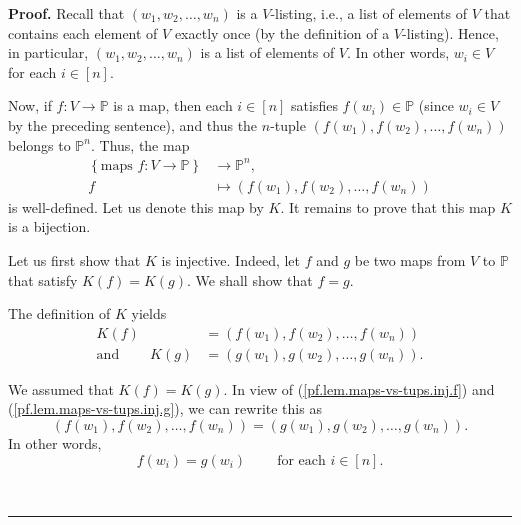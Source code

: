 \documentclass[numbers=enddot,12pt,final,onecolumn,notitlepage]{scrartcl}%
\numberwithin{exer}{section}
\theoremstyle{definition}
\newenvironment{proof}[1][Proof]{\noindent\textbf{#1.} }{\ \rule{0.5em}{0.5em}}
\newenvironment{verlong}{}{}
\begin{document}
\begin{verlong}


\begin{proof}
Recall that $\left(  w_{1},w_{2},\ldots,w_{n}\right)  $ is a $V$-listing,
i.e., a list of elements of $V$ that contains each element of $V$ exactly once
(by the definition of a $V$-listing). Hence, in particular, $\left(
w_{1},w_{2},\ldots,w_{n}\right)  $ is a list of elements of $V$. In other
words, $w_{i}\in V$ for each $i\in\left[  n\right]  $.

Now, if $f:V\rightarrow\mathbb{P}$ is a map, then each $i\in\left[  n\right]
$ satisfies $f\left(  w_{i}\right)  \in\mathbb{P}$ (since $w_{i}\in V$ by the
preceding sentence), and thus the $n$-tuple $\left(  f\left(  w_{1}\right)
,f\left(  w_{2}\right)  ,\ldots,f\left(  w_{n}\right)  \right)  $ belongs to
$\mathbb{P}^{n}$. Thus, the map%
\begin{align*}
\left\{  \text{maps }f:V\rightarrow\mathbb{P}\right\}   &  \rightarrow
\mathbb{P}^{n},\\
f  &  \mapsto\left(  f\left(  w_{1}\right)  ,f\left(  w_{2}\right)
,\ldots,f\left(  w_{n}\right)  \right)
\end{align*}
is well-defined. Let us denote this map by $K$. It remains to prove that this
map $K$ is a bijection.

Let us first show that $K$ is injective. Indeed, let $f$ and $g$ be two maps
from $V$ to $\mathbb{P}$ that satisfy $K\left(  f\right)  =K\left(  g\right)
$. We shall show that $f=g$.

The definition of $K$ yields
\begin{align}
K\left(  f\right)   &  =\left(  f\left(  w_{1}\right)  ,f\left(  w_{2}\right)
,\ldots,f\left(  w_{n}\right)  \right) \label{pf.lem.maps-vs-tups.inj.f}\\
\text{and}\ \ \ \ \ \ \ \ \ \ K\left(  g\right)   &  =\left(  g\left(
w_{1}\right)  ,g\left(  w_{2}\right)  ,\ldots,g\left(  w_{n}\right)  \right)
. \label{pf.lem.maps-vs-tups.inj.g}%
\end{align}


We assumed that $K\left(  f\right)  =K\left(  g\right)  $. In view of
(\ref{pf.lem.maps-vs-tups.inj.f}) and (\ref{pf.lem.maps-vs-tups.inj.g}), we
can rewrite this as%
\[
\left(  f\left(  w_{1}\right)  ,f\left(  w_{2}\right)  ,\ldots,f\left(
w_{n}\right)  \right)  =\left(  g\left(  w_{1}\right)  ,g\left(  w_{2}\right)
,\ldots,g\left(  w_{n}\right)  \right)  .
\]
In other words,%
\begin{equation}
f\left(  w_{i}\right)  =g\left(  w_{i}\right)  \ \ \ \ \ \ \ \ \ \ \text{for
each }i\in\left[  n\right]  . \label{pf.lem.maps-vs-tups.inj.1}%
\end{equation}



\end{proof}
\end{verlong}
\end{document}
